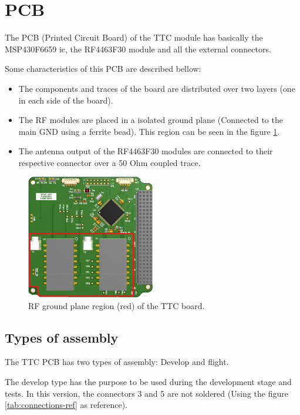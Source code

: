 \documentclass[12pt]{book}
\begin{document}
\section{PCB}

The PCB (Printed Circuit Board) of the TTC module has basically the MSP430F6659 ic, the RF4463F30 module and all the external connectors.

Some characteristics of this PCB are described bellow:

\begin{itemize}
	\item The components and traces of the board are distributed over two layers (one in each side of the board).
	\item The RF modules are placed in a isolated ground plane (Connected to the main GND using a ferrite bead). This region can be seen in the figure \ref{fig:rf-ground-plane}.
	\item The antenna output of the RF4463F30 modules are connected to their respective connector over a 50 Ohm coupled trace.
\end{itemize}

\begin{figure}[!h]
	\begin{center}
		\includegraphics[width=0.5\textwidth]{figures/ttc_rf_ground_plane.png}
		\caption{RF ground plane region (red) of the TTC board.}
		\label{fig:rf-ground-plane}
	\end{center}
\end{figure}

\subsection{Types of assembly}

The TTC PCB has two types of assembly: Develop and flight.

The develop type has the purpose to be used during the development stage and tests. In this version, the connectors 3 and 5 are not soldered (Using the figure \ref{tab:connections-ref} as reference).
\end{document}
